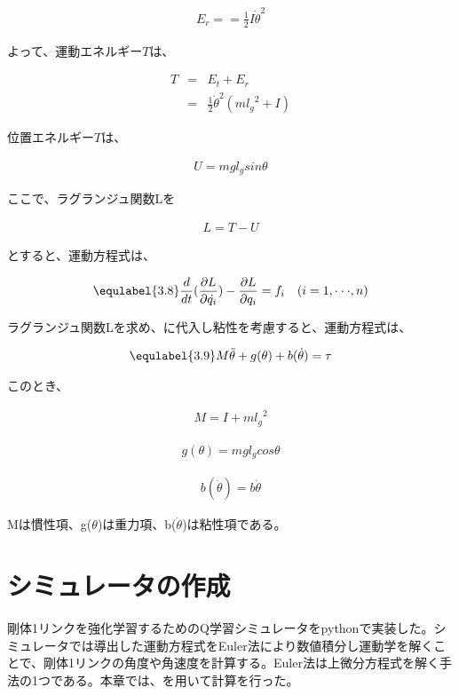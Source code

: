 \begin{eqnarray}
  E_{r} =
  =\frac{1}{2}I{\dot{\theta}}^2
\end{eqnarray}

よって、運動エネルギー$T$は、

\begin{eqnarray}
  T
  &=&E_{t} + E_{r} \nonumber \\
  &=&\frac{1}{2}{\dot{\theta}}^2(m{l_{g}}^2 + I)
\end{eqnarray}

位置エネルギー$T$は、

\begin{eqnarray}
  U
  = mgl_{g}sin\theta
\end{eqnarray}

ここで、ラグランジュ関数Lを

\begin{eqnarray}
  L
  =T - U
\end{eqnarray}

とすると、運動方程式は、

\begin{eqnarray}
  \equlabel{3.8}
  \frac{d}{dt}(\frac{\partial L}{\partial \dot{q_{i}}}) - \frac{\partial L}{\partial q_{i}} = f_{i} \quad (i = 1,\cdot\cdot\cdot, n)
\end{eqnarray}

ラグランジュ関数Lを求め、に代入し粘性を考慮すると、運動方程式は、

\begin{eqnarray}
  \equlabel{3.9}
  M\ddot{\theta} + g(\theta) + b(\dot{\theta}) = \tau
\end{eqnarray}

このとき、

\begin{eqnarray}
  M = I + m{l_{g}}^2
\end{eqnarray}

\begin{eqnarray}
  g(\theta) = mgl_{g}cos\theta
\end{eqnarray}

\begin{eqnarray}
  b(\dot{\theta}) = b\dot{\theta}
\end{eqnarray}

Mは慣性項、g($\theta$)は重力項、b($\dot{\theta}$)は粘性項である。

\section{シミュレータの作成}
剛体1リンクを強化学習するためのQ学習シミュレータをpythonで実装した。シミュレータでは導出した運動方程式をEuler法により数値積分し運動学を解くことで、剛体1リンクの角度や角速度を計算する。Euler法は上微分方程式を解く手法の1つである。本章では、を用いて計算を行った。\\

